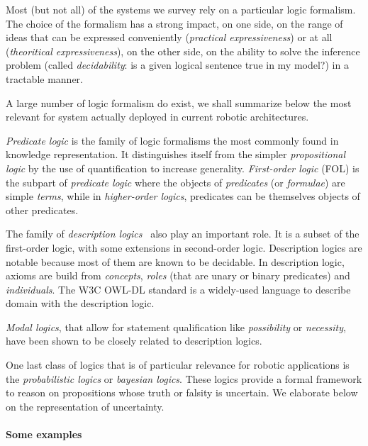 \documentclass[a4paper, twocolumn]{article}
\begin{document}
Most (but not all) of the systems we survey rely on a particular logic
formalism. The choice of the formalism has a strong impact, on one side, on the
range of ideas that can be expressed conveniently (\emph{practical
expressiveness}) or at all (\emph{theoritical expressiveness}), on the other
side, on the ability to solve the inference problem (called
\emph{decidability}: is a given logical sentence true in my model?) in a
tractable manner.

A large number of logic formalism do exist, we shall summarize below the most
relevant for system actually deployed in current robotic architectures.

\emph{Predicate logic} is the family of logic formalisms the most commonly
found in knowledge representation. It distinguishes itself from the simpler
\emph{propositional logic} by the use of quantification to increase generality.
\emph{First-order logic} (FOL) is the subpart of \emph{predicate logic} where the
objects of \emph{predicates} (or \emph{formulae}) are simple \emph{terms},
while in \emph{higher-order logics}, predicates can be themselves objects of
other predicates.

The family of \emph{description logics}~\cite{Baader2008} also play an
important role. It is a subset of the first-order logic, with some extensions
in second-order logic. Description logics are notable because most of them are
known to be decidable. In description logic, axioms are build from
\emph{concepts}, \emph{roles} (that are unary or binary predicates) and
\emph{individuals}. The W3C OWL-DL standard is a widely-used language to describe
domain with the description logic.

\emph{Modal logics}, that allow for statement qualification
like \emph{possibility} or \emph{necessity}, have been shown to be closely
related to description logics.


One last class of logics that is of particular relevance for robotic
applications is the \emph{probabilistic logics} or \emph{bayesian logics}.
These logics provide a formal framework to reason on propositions whose truth
or falsity is uncertain. We elaborate below on the representation of uncertainty.


\paragraph{Some examples}
\end{document}
